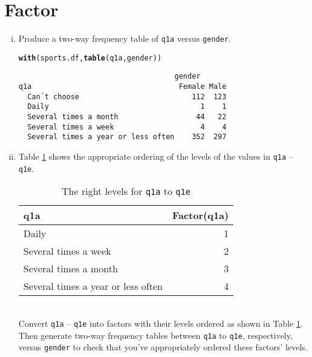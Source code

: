 \documentclass[12pt,a4paper]{article}\usepackage[]{graphicx}\usepackage[]{color}
\makeatletter
\newcommand{\hlstd}[1]{\textcolor[rgb]{0.345,0.345,0.345}{#1}}%
\newcommand{\hlkwd}[1]{\textcolor[rgb]{0.737,0.353,0.396}{\textbf{#1}}}%
\newenvironment{kframe}{%
 \def\at@end@of@kframe{}%
 \ifinner\ifhmode%
  \def\at@end@of@kframe{\end{minipage}}%
  \begin{minipage}{\columnwidth}%
 \fi\fi%
 \def\FrameCommand##1{\hskip\@totalleftmargin \hskip-\fboxsep
 \colorbox{shadecolor}{##1}\hskip-\fboxsep
     \hskip-\linewidth \hskip-\@totalleftmargin \hskip\columnwidth}%
 \MakeFramed {\advance\hsize-\width
   \@totalleftmargin\z@ \linewidth\hsize
   \@setminipage}}%
 {\par\unskip\endMakeFramed%
 \at@end@of@kframe}
\newenvironment{knitrout}{}{} %
\makeatother
\begin{document}
\begin{enumerate}[(i)]
\end{enumerate}

\section{Factor}
\label{sec:fac}
\begin{enumerate}[(i)] 
\item Produce a two-way frequency table of \texttt{q1a} versus \texttt{gender}.
\begin{knitrout}
\color{fgcolor}\begin{kframe}
\begin{alltt}
\hlkwd{with}\hlstd{(sports.df,} \hlkwd{table}\hlstd{(q1a, gender))}
\end{alltt}
\begin{verbatim}
                                    gender
q1a                                  Female Male
  Can´t choose                          112  123
  Daily                                   1    1
  Several times a month                  44   22
  Several times a week                    4    4
  Several times a year or less often    352  297
\end{verbatim}
\end{kframe}
\end{knitrout}
\item Table \ref{tab:level} shows the appropriate ordering of the levels of the values in \texttt{q1a} -- \texttt{q1e}. \\
\begin{table}[!h]
  \centering
  \caption{The right levels for \texttt{q1a} to \texttt{q1e}}
  \begin{tabular}[h]{lr}
    q1a & Factor(q1a)\\
\hline
Daily & 1\\
Several times a week & 2\\
Several times a month & 3\\
Several times a year or less often & 4
  \end{tabular}
  \label{tab:level}
\end{table} \\
Convert \texttt{q1a} -- \texttt{q1e} into factors with their levels ordered as shown in Table \ref{tab:level}. Then generate two-way frequency tables between \texttt{q1a} to
\texttt{q1e}, respectively, versus \texttt{gender} to check that you've appropriately ordered these factors' levels.
\begin{knitrout}
\color{fgcolor}\begin{kframe}

\end{kframe}
\end{knitrout}
\end{enumerate}
\end{document}
